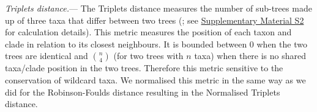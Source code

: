\documentclass[12pt,letterpaper]{article}
\renewcommand{\subsubsection}[1]{%
\vspace{2ex}
\noindent
\textit{#1.}---}
\begin{document}
\subsubsection{Triplets distance}
The Triplets distance \citep{dobson1975triplets} measures the number of sub-trees made up of three taxa that differ between two trees (\citealt{critchlowthe1996}; see \hyperref[SupplementaryMaterial]{Supplementary Material S2} for calculation details). This metric measures the position of each taxon and clade in relation to its closest neighbours. It is bounded between 0 when the two trees are identical and $\binom{n}{4}$ (for two trees with $n$ taxa) when there is no shared taxa/clade position in the two trees. Therefore this metric sensitive to the conservation of wildcard taxa. We normalised this metric in the same way as we did for the Robinson-Foulds distance resulting in the Normalised Triplets distance.

\end{document}
